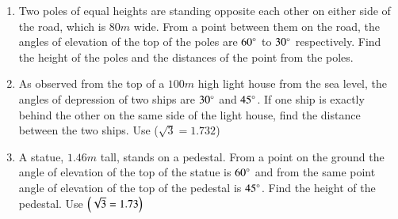 \begin{enumerate}[label=\thesubsection.\arabic*.,ref=\thesubsection.\theenumi]
\hfill{}\item Two poles of equal heights are standing opposite each other on either side of the road, which is $80 m$  wide. From a point between them on the road, the angles of elevation of the top of the poles are $60\degree$ to $30\degree$ respectively. Find the height of the poles and the distances of the point from the poles.
\hfill{}
		\item As observed from the top of a $100 m$ high light house from the sea level, the angles of depression of two ships are $30\degree$ and $45\degree$. If one ship is exactly behind the other on the same side of the light house, find the distance between the two ships. {Use} ($\sqrt3 = 1.732$)
\hfill{}
\item A statue, $1.46m$ tall, stands on a pedestal. From a point on the ground the angle of elevation of the top of the statue is $60\degree{}$ and from the same point angle of elevation of the top of the pedestal is $45\degree{}$. Find the height of the pedestal. Use $\left(\sqrt{3}=1.73\right)$


\end{enumerate}
